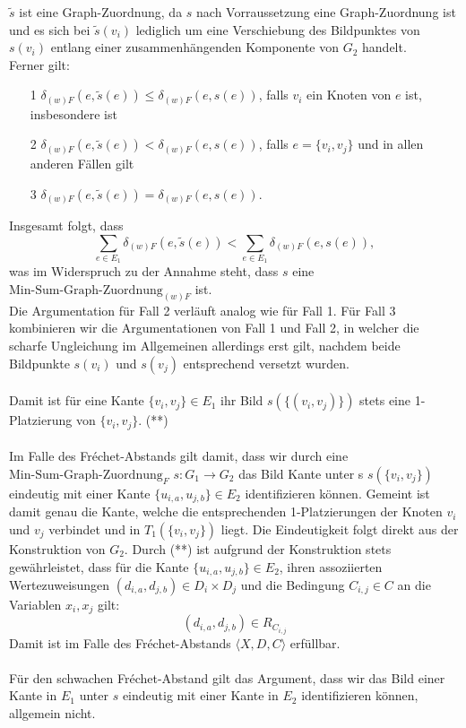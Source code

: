 \documentclass[a4paper, 12pt, twoside]{article}
\theoremstyle{Format1} %
\begin{document}
$\tilde{s}$ ist eine Graph-Zuordnung, da $s$ nach Vorraussetzung eine Graph-Zuordnung ist und es sich bei $\tilde{s}(v_i)$ lediglich um eine Verschiebung
des Bildpunktes von $s(v_i)$ entlang einer zusammenhängenden Komponente von $G_2$ handelt.
\\
Ferner gilt:
\begin{enumerate}
	\item[1] $\delta_{(w)F}(e, \tilde{s}(e)) \leq \delta_{(w)F}(e, s(e))$, falls $v_i$ ein Knoten von $e$ ist, insbesondere ist
	\item[2] $\delta_{(w)F}(e, \tilde{s}(e)) < \delta_{(w)F}(e, s(e))$, falls $e = \{v_i, v_j\}$ und in allen anderen Fällen gilt
	\item[3] $\delta_{(w)F}(e, \tilde{s}(e)) = \delta_{(w)F}(e, s(e))$.
\end{enumerate}
Insgesamt folgt, dass
$$\sum_{{e}\in E_1} \delta_{(w)F}(e, \tilde{s}(e)) < \sum_{{e}\in E_1} \delta_{(w)F}(e, s(e)),$$
was im Widerspruch zu der Annahme steht, dass $s$ eine $\text{Min-Sum-Graph-Zuordnung}_{(w)F}$ ist.
\\
Die Argumentation für Fall 2 verläuft analog wie für Fall 1.
Für Fall 3 kombinieren wir die Argumentationen von Fall 1 und Fall 2, in welcher die scharfe Ungleichung im Allgemeinen allerdings erst gilt,
nachdem beide Bildpunkte $s(v_i)$ und $s(v_j)$ entsprechend versetzt wurden.
\\
\\
Damit ist für eine Kante $\{v_i, v_j\} \in E_1$ ihr Bild $s(\{(v_i, v_j)\})$ stets eine 1-Platzierung von $\{v_i, v_j\}$. (**)
\\
\\
Im Falle des Fréchet-Abstands gilt damit, dass wir durch eine $\text{Min-Sum-Graph-Zuordnung}_F$ $s: G_1 \to G_2$ das Bild Kante unter s
$s(\{v_i, v_j\})$ eindeutig mit einer Kante $\{u_{i,a}, u_{j,b}\} \in E_2$ identifizieren können. Gemeint ist damit genau die Kante, welche
die entsprechenden 1-Platzierungen der Knoten $v_i$ und $v_j$ verbindet und in $T_1(\{v_i, v_j\})$ liegt. Die Eindeutigkeit folgt direkt aus der
Konstruktion von $G_2$.
Durch (**) ist aufgrund der Konstruktion stets gewährleistet, dass für die Kante $\{u_{i,a}, u_{j,b}\} \in E_2$, ihren assoziierten Wertezuweisungen $(d_{i,a}, d_{j,b}) \in D_i \times D_j$
und die Bedingung $C_{i,j} \in C$ an die Variablen $x_i, x_j$ gilt:
$$(d_{i,a},d_{j,b}) \in R_{C_{i,j}}$$
Damit ist im Falle des Fréchet-Abstands $\langle X,D,C \rangle$ erfüllbar.
\\
\\
Für den schwachen Fréchet-Abstand gilt das Argument, dass wir das Bild einer Kante in $E_1$ unter $s$ eindeutig mit einer Kante in $E_2$ identifizieren können, allgemein nicht.
\end{document}
